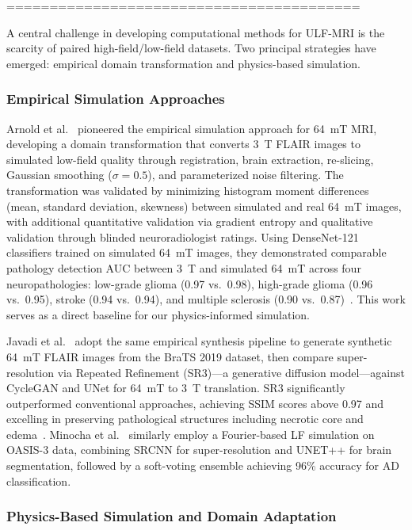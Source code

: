 =========================================

A central challenge in developing computational methods for ULF-MRI is the scarcity of paired high-field/low-field datasets. Two principal strategies have emerged: empirical domain transformation and physics-based simulation.

\subsubsection{Empirical Simulation Approaches}

Arnold et al.~\cite{arnold2022simulated} pioneered the empirical simulation approach for 64~mT MRI, developing a domain transformation that converts 3~T FLAIR images to simulated low-field quality through registration, brain extraction, re-slicing, Gaussian smoothing ($\sigma = 0.5$), and parameterized noise filtering. The transformation was validated by minimizing histogram moment differences (mean, standard deviation, skewness) between simulated and real 64~mT images, with additional quantitative validation via gradient entropy and qualitative validation through blinded neuroradiologist ratings. Using DenseNet-121 classifiers trained on simulated 64~mT images, they demonstrated comparable pathology detection AUC between 3~T and simulated 64~mT across four neuropathologies: low-grade glioma (0.97 vs.\ 0.98), high-grade glioma (0.96 vs.\ 0.95), stroke (0.94 vs.\ 0.94), and multiple sclerosis (0.90 vs.\ 0.87)~\cite{arnold2022simulated}. This work serves as a direct baseline for our physics-informed simulation.

Javadi et al.~\cite{javadi2025diffusion} adopt the same empirical synthesis pipeline to generate synthetic 64~mT FLAIR images from the BraTS 2019 dataset, then compare super-resolution via Repeated Refinement (SR3)---a generative diffusion model---against CycleGAN and UNet for 64~mT to 3~T translation. SR3 significantly outperformed conventional approaches, achieving SSIM scores above 0.97 and excelling in preserving pathological structures including necrotic core and edema~\cite{javadi2025diffusion}. Minocha et al.~\cite{minocha2024lowfieldad} similarly employ a Fourier-based LF simulation on OASIS-3 data, combining SRCNN for super-resolution and UNET++ for brain segmentation, followed by a soft-voting ensemble achieving 96\% accuracy for AD classification.

\subsubsection{Physics-Based Simulation and Domain Adaptation}

